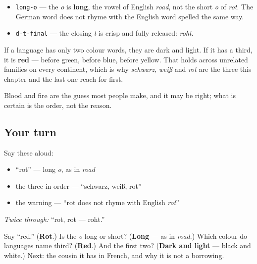 \begin{sounds}
\begin{itemize}
\raggedright
  \item \texttt{long-o} — the \emph{o} is \textbf{long}, the vowel of English \emph{road}, not the short \emph{o} of \emph{rot}. The German word does not rhyme with the English word spelled the same way.
  \item \texttt{d-t-final} — the closing \emph{t} is crisp and fully released: \emph{roht}.
\end{itemize}
\end{sounds}

\begin{culture}
If a language has only two colour words, they are dark and light. If it has a third, it is \textbf{red} — before green, before blue, before yellow. That holds across unrelated families on every continent, which is why \emph{schwarz}, \emph{weiß} and \emph{rot} are the three this chapter and the last one reach for first.

Blood and fire are the guess most people make, and it may be right; what is certain is the order, not the reason.
\end{culture}

\subsection*{Your turn}
Say these aloud:

\begin{itemize}
\raggedright
  \item \textquotedblleft{}rot\textquotedblright{} — long \emph{o}, as in \emph{road}
  \item the three in order — \textquotedblleft{}schwarz, weiß, rot\textquotedblright{}
  \item the warning — \textquotedblleft{}rot does not rhyme with English \emph{rot}\textquotedblright{}
\end{itemize}

\emph{Twice through:} \textquotedblleft{}rot, rot — roht.\textquotedblright{}

\begin{tcolorbox}[breakable,colback=teal!4,colframe=teal!35!black,title={Before you move on}]
Say \textquotedblleft{}red.\textquotedblright{} (\textbf{Rot}.) Is the \emph{o} long or short? (\textbf{Long} — as in \emph{road}.) Which colour do languages name third? (\textbf{Red}.) And the first two? (\textbf{Dark and light} — black and white.) Next: the cousin it has in French, and why it is not a borrowing.
\end{tcolorbox}
